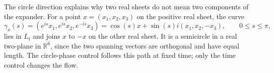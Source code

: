 \begin{example}
The circle direction explains why two real sheets do not mean two components of the expander. For a point $x=(x_1,x_2,x_3)$ on the positive real sheet, the curve
\[
 \gamma_x(s)=\left(e^{is}x_1,e^{is}x_2,e^{-is}x_3\right)
 =\cos(s)x+\sin(s)i(x_1,x_2,-x_3),\qquad 0\leq s\leq\pi,
\]
lies in $L_t$ and joins $x$ to $-x$ on the other real sheet. It is a semicircle in a real two-plane in $\mathbb R^6$, since the two spanning vectors are orthogonal and have equal length. The circle-phase control follows this path at fixed time; only the time control changes the flow.
\end{example}
